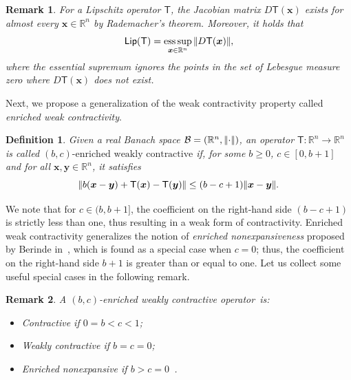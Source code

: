 \documentclass[journal,twoside,web]{ieeecolor}
\DeclareMathOperator*{\esup}{ess\,sup}
\newcommand{\norm}[1]{{\left\vert\kern-0.25ex\left\vert #1\right\vert\kern-0.25ex\right\vert}}
\newcommand{\rea }{\mathbb{R}}
\newcommand{\xb}{\boldsymbol{x}}
\newcommand{\yb}{\boldsymbol{y}}
\newcommand{\Ts}{\mathsf{T}}
\newcommand{\Bc}{\mathcal{B}}
\newcommand{\Lip}{\mathsf{Lip}}
\newtheorem{rem}{Remark}
\newtheorem{defn}{Definition}
\begin{document}
\begin{rem}\label{rem:esup}
    For a Lipschitz operator $\Ts$, the Jacobian matrix $D\Ts(\xb)$ exists for almost every $\xb\in\rea^n$ by Rademacher's theorem. Moreover, it holds that
    $$
    \Lip(\Ts) = \esup_{\xb\in\rea^n} \norm{D\Ts(\xb)},
    $$
    where the essential supremum ignores the points in the set of Lebesgue measure zero where $D\Ts(\xb)$ does not exist.
\end{rem}
%
Next, we propose a generalization of the weak contractivity property called \textit{enriched weak contractivity}.
%
\begin{defn}\label{def:seNe}
%
Given a real Banach space $\Bc={(\rea^n,\norm{\cdot})}$, an operator ${\Ts:\rea^n\rightarrow\rea^n}$ is called $(b,c)\text{-enriched weakly contractive}$ if, for some $b\geq0$, $c\in[0,b+1]$ and for all $\xb,\yb \in \rea^n$, it satisfies
\begin{equation}\label{eq:sene}
\norm{b(\xb-\yb)+\Ts(\xb)-\Ts(\yb)} \leq (b-c+1)\norm{\xb-\yb}.
\end{equation}
%
%
\end{defn}
%
We note that for $c\in(b,b+1]$, the coefficient on the right-hand side $(b-c+1)$ is strictly less than one, thus resulting in a weak form of contractivity.
%
Enriched weak contractivity generalizes the notion of \textit{enriched nonexpansiveness} proposed by Berinde in~\cite{berinde2021fixed}, which is found as a special case when $c=0$; thus, the coefficient on the right-hand side $b+1$ is greater than or equal to one.
%
Let us collect some useful special cases in the following remark.
%
\begin{rem}\label{rem:specialcases}
    A $(b,c)$-enriched weakly contractive operator~is:
    \begin{itemize}
        \item Contractive if $0=b<c<1$;
        \item Weakly contractive if $b=c=0$;
        \item Enriched nonexpansive if $b>c=0$~\cite[Eq.~(16)]{berinde2021fixed}.
    \end{itemize}
\end{rem}
\end{document}
